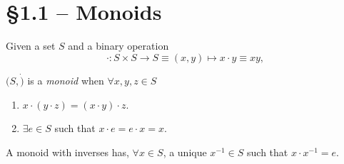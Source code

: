 \documentclass{article}
\begin{document}
\section{\S 1.1 -- Monoids}

\begin{defn}[Monoid]
  \label{def:monoid}
  Given a set $S$ and a binary operation 
  $$
  \cdot : S \times S \to S \equiv (x, y) \mapsto x \cdot y \equiv xy,
  $$

  $(S, \dot)$ is a \emph{monoid} when $\forall x, y, z \in S$
  \begin{enumerate}
    \item{$x \cdot (y \cdot z) = (x \cdot y) \cdot z$.}
    \item{$\exists e \in S$ such that $x \cdot e = e \cdot x = x$.}
  \end{enumerate}
\end{defn}

A monoid with inverses has, $\forall x \in S$, a unique $x^{-1} \in S$
such that $x \cdot x^{-1} = e$.
\end{document}
